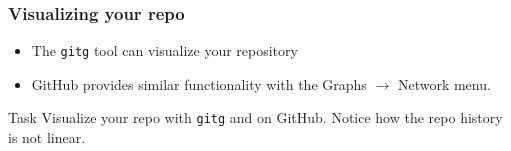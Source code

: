 
\begin{frame}

\frametitle{Visualizing your repo}

\begin{itemize}
	\item The \texttt{gitg} tool can visualize your repository
	\item GitHub provides similar functionality with the Graphs $\rightarrow$ Network menu.
\end{itemize}

\begin{block}{Task}
	Visualize your repo with \texttt{gitg} and on GitHub. Notice how the repo history is not linear. 
\end{block}

\end{frame}
